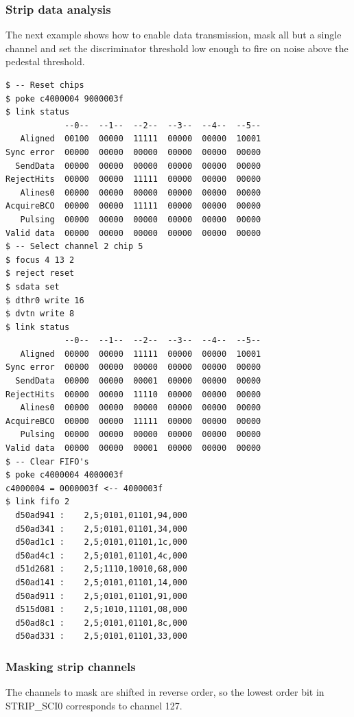 \documentclass[11pt]{article}
\begin{document}
\pagebreak
\subsubsection{Strip data analysis}
The next example shows how to enable data transmission, mask all but a single
channel and set the discriminator threshold low enough to fire on noise above
the pedestal threshold.

\begin{verbatim}
$ -- Reset chips
$ poke c4000004 9000003f
$ link status
            --0--  --1--  --2--  --3--  --4--  --5--
   Aligned  00100  00000  11111  00000  00000  10001
Sync error  00000  00000  00000  00000  00000  00000
  SendData  00000  00000  00000  00000  00000  00000
RejectHits  00000  00000  11111  00000  00000  00000
   Alines0  00000  00000  00000  00000  00000  00000
AcquireBCO  00000  00000  11111  00000  00000  00000
   Pulsing  00000  00000  00000  00000  00000  00000
Valid data  00000  00000  00000  00000  00000  00000
$ -- Select channel 2 chip 5
$ focus 4 13 2
$ reject reset
$ sdata set
$ dthr0 write 16
$ dvtn write 8
$ link status
            --0--  --1--  --2--  --3--  --4--  --5--
   Aligned  00000  00000  11111  00000  00000  10001
Sync error  00000  00000  00000  00000  00000  00000
  SendData  00000  00000  00001  00000  00000  00000
RejectHits  00000  00000  11110  00000  00000  00000
   Alines0  00000  00000  00000  00000  00000  00000
AcquireBCO  00000  00000  11111  00000  00000  00000
   Pulsing  00000  00000  00000  00000  00000  00000
Valid data  00000  00000  00001  00000  00000  00000
$ -- Clear FIFO's
$ poke c4000004 4000003f
c4000004 = 0000003f <-- 4000003f
$ link fifo 2
  d50ad941 :    2,5;0101,01101,94,000
  d50ad341 :    2,5;0101,01101,34,000
  d50ad1c1 :    2,5;0101,01101,1c,000
  d50ad4c1 :    2,5;0101,01101,4c,000
  d51d2681 :    2,5;1110,10010,68,000
  d50ad141 :    2,5;0101,01101,14,000
  d50ad911 :    2,5;0101,01101,91,000
  d515d081 :    2,5;1010,11101,08,000
  d50ad8c1 :    2,5;0101,01101,8c,000
  d50ad331 :    2,5;0101,01101,33,000
\end{verbatim}

\pagebreak
\subsubsection{Masking strip channels}

The channels to mask are shifted in reverse order, so the lowest order bit in
STRIP\_SCI0 corresponds to channel 127.
\end{document}

